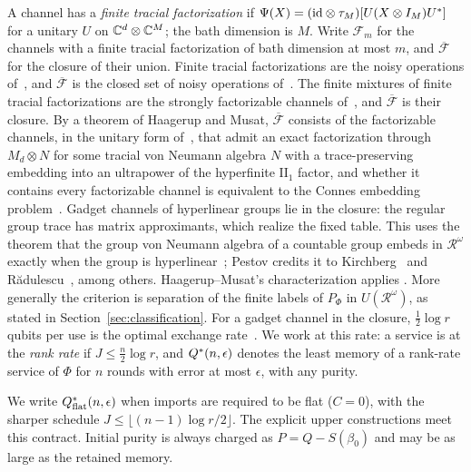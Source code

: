 A channel has a \emph{finite tracial factorization} if $\Psi(X)=(\mathrm{id}\otimes\tau_M)[U(X\otimes I_M)U^*]$ for a unitary $U$ on $\mathbb C^d\otimes\mathbb C^M$;
the bath dimension is $M$. Write $\mathcal F_m$ for the channels with a finite tracial factorization of bath dimension at most $m$, and
$\overline{\mathcal F}$ for the closure of their union. Finite tracial factorizations are the noisy operations
of~\cite{HorodeckiHorodeckiOppenheim2003}, and $\overline{\mathcal F}$ is the closed set of noisy operations
of~\cite{GourEtAl2015}. The finite mixtures of finite tracial factorizations are the strongly factorizable channels
of~\cite{LieSonBoesNgWilming2026}, and $\overline{\mathcal F}$ is their closure. By a theorem of
Haagerup and Musat, $\overline{\mathcal F}$ consists of the factorizable channels, in the unitary form of~\cite[Theorem~2.2]{HaagerupMusat2011}, that admit an
exact factorization through $M_d\otimes N$ for some tracial von Neumann algebra $N$ with a trace-preserving embedding into an ultrapower of the
hyperfinite $\mathrm{II}_1$ factor, and whether it contains every factorizable channel is equivalent to the Connes embedding
problem~\cite[Theorems~3.6 and~3.7]{HaagerupMusat2015}. Gadget channels of hyperlinear groups lie in the closure: the regular
group trace has matrix approximants, which realize the fixed table.
This uses the theorem that the group von Neumann algebra of a countable
group embeds in $\mathcal R^\omega$ exactly when the group is
hyperlinear~\cite[Theorem~8.5]{Pestov2008}; Pestov credits it to
Kirchberg~\cite{Kirchberg1994} and
R\u adulescu~\cite[Proposition~2.5]{Radulescu2002}, among others.
Haagerup--Musat's characterization applies
\cite[Theorem~3.6]{HaagerupMusat2015}. More generally the criterion
is separation of the finite labels of $P_\Phi$ in
$U(\mathcal R^\omega)$, as stated in Section~\ref{sec:classification}. For a gadget channel in the closure,
$\frac12\log r$ qubits per use is the optimal exchange rate~\cite[Propositions~3.1 and~9.1]{DouglasMghirbiB}. We work at this rate: a service is at the \emph{rank rate} if $J\le\frac n2\log r$, and
$Q^{*}(n,\epsilon)$ denotes the least memory of a rank-rate service of $\Phi$ for $n$ rounds with error at most $\epsilon$, with any purity.

We write $Q^{*}_{\rm flat}(n,\epsilon)$ when imports are required to be flat ($C=0$), with the sharper schedule
$J\le\lfloor(n-1)\log r/2\rfloor$. The explicit upper constructions meet this contract. Initial purity is always
charged as $P=Q-S(\beta_0)$ and may be as large as the retained memory.

